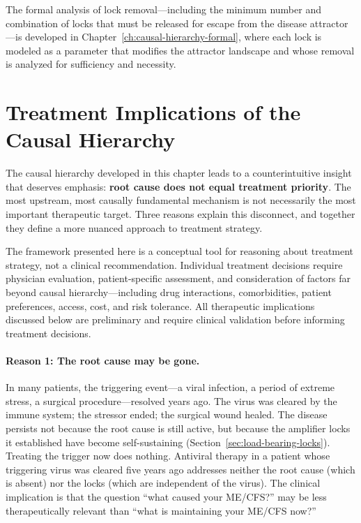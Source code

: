 The formal analysis of lock removal---including the minimum number and combination of locks that must be released for escape from the disease attractor---is developed in Chapter~\ref{ch:causal-hierarchy-formal}, where each lock is modeled as a parameter that modifies the attractor landscape and whose removal is analyzed for sufficiency and necessity.



\section{Treatment Implications of the Causal Hierarchy}
\label{sec:treatment-vs-cause}

The causal hierarchy developed in this chapter leads to a counterintuitive insight that deserves emphasis: \textbf{root cause does not equal treatment priority}. The most upstream, most causally fundamental mechanism is not necessarily the most important therapeutic target. Three reasons explain this disconnect, and together they define a more nuanced approach to treatment strategy.

\begin{warning}
The framework presented here is a conceptual tool for reasoning about treatment strategy, not a clinical recommendation. Individual treatment decisions require physician evaluation, patient-specific assessment, and consideration of factors far beyond causal hierarchy---including drug interactions, comorbidities, patient preferences, access, cost, and risk tolerance. All therapeutic implications discussed below are preliminary and require clinical validation before informing treatment decisions.
\end{warning}

\paragraph{Reason 1: The root cause may be gone.} In many patients, the triggering event---a viral infection, a period of extreme stress, a surgical procedure---resolved years ago. The virus was cleared by the immune system; the stressor ended; the surgical wound healed. The disease persists not because the root cause is still active, but because the amplifier locks it established have become self-sustaining (Section~\ref{sec:load-bearing-locks}). Treating the trigger now does nothing. Antiviral therapy in a patient whose triggering virus was cleared five years ago addresses neither the root cause (which is absent) nor the locks (which are independent of the virus). The clinical implication is that the question ``what caused your ME/CFS?'' may be less therapeutically relevant than ``what is maintaining your ME/CFS now?''


